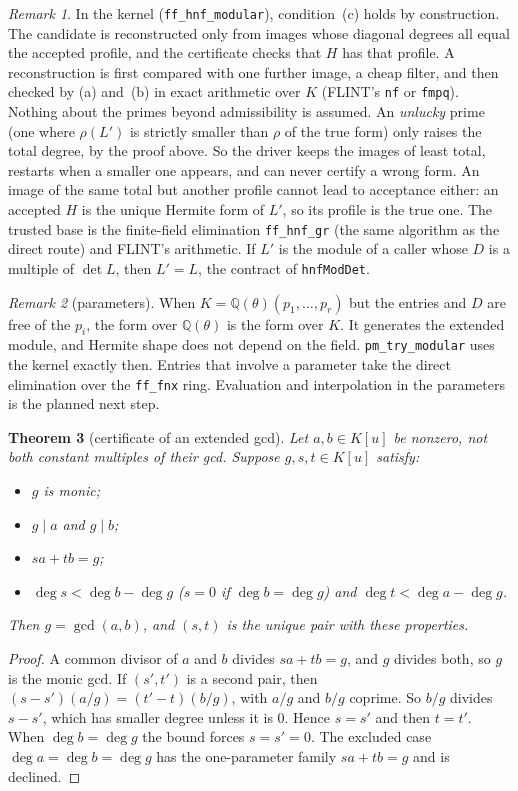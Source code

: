 \documentclass[11pt]{article}
\newtheorem{theorem}{Theorem}[section]
\theoremstyle{definition}
\theoremstyle{remark}
\newtheorem{remark}[theorem]{Remark}
\newcommand{\Q}{\mathbb{Q}}
\newcommand{\code}[1]{\texttt{#1}}
\begin{document}
\begin{remark}
In the kernel (\code{ff\_hnf\_modular}), condition~(c) holds by construction. The
candidate is reconstructed only from images whose diagonal degrees all equal the
accepted profile, and the certificate checks that $H$ has that profile. A
reconstruction is first compared with one further image, a cheap filter, and then
checked by (a) and~(b) in exact arithmetic over $K$ (FLINT's \code{nf} or
\code{fmpq}). Nothing about the primes beyond admissibility is assumed. An
\emph{unlucky} prime (one where $\rho(L')$ is strictly smaller than $\rho$ of the
true form) only raises the total degree, by the proof above. So the driver keeps
the images of least total, restarts when a smaller one appears, and can never
certify a wrong form. An image of the same total but another profile cannot
lead to acceptance either: an accepted $H$ is the unique Hermite form of $L'$, so
its profile is the true one. The trusted base is the finite-field elimination
\code{ff\_hnf\_gr} (the same algorithm as the direct route) and FLINT's arithmetic.
If $L'$ is the module of a caller whose $D$ is a multiple of
$\det L$, then $L'=L$, the contract of \code{hnfModDet}.
\end{remark}

\begin{remark}[parameters]
When $K=\Q(\theta)(p_1,\dots,p_r)$ but the entries and $D$ are free of the $p_i$,
the form over $\Q(\theta)$ is the form over $K$. It generates the extended module,
and Hermite shape does not depend on the field. \code{pm\_try\_modular} uses the
kernel exactly then. Entries that involve a parameter take the direct elimination
over the \code{ff\_fnx} ring. Evaluation and interpolation in the parameters is the
planned next step.
\end{remark}

\begin{theorem}[certificate of an extended gcd]\label{thm:E7xgcd}
Let $a,b\in K[u]$ be nonzero, not both constant multiples of their gcd. Suppose
$g,s,t\in K[u]$ satisfy:
\begin{itemize}
\item $g$ is monic;
\item $g\mid a$ and $g\mid b$;
\item $sa+tb=g$;
\item $\deg s<\deg b-\deg g$ ($s=0$ if $\deg b=\deg g$) and $\deg t<\deg a-\deg g$.
\end{itemize}
Then $g=\gcd(a,b)$, and $(s,t)$ is the unique pair with these properties.
\end{theorem}
\begin{proof}
A common divisor of $a$ and $b$ divides $sa+tb=g$, and $g$ divides both, so $g$ is
the monic gcd. If $(s',t')$ is a second pair, then
$(s-s')(a/g)=(t'-t)(b/g)$, with $a/g$ and $b/g$ coprime. So $b/g$ divides $s-s'$,
which has smaller degree unless it is $0$. Hence $s=s'$ and then $t=t'$. When
$\deg b=\deg g$ the bound forces $s=s'=0$. The excluded case
$\deg a=\deg b=\deg g$ has the one-parameter family $s a+tb=g$ and is declined.
\end{proof}
\end{document}
